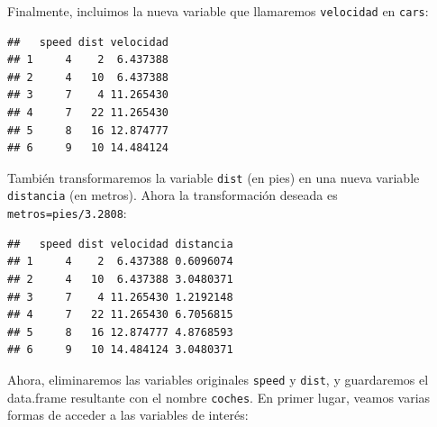 \documentclass[]{book}
\newenvironment{Shaded}{\begin{snugshade}}{\end{snugshade}}
\newcommand{\FloatTok}[1]{\textcolor[rgb]{0.00,0.00,0.81}{#1}}
\newcommand{\KeywordTok}[1]{\textcolor[rgb]{0.13,0.29,0.53}{\textbf{#1}}}
\newcommand{\NormalTok}[1]{#1}
\newcommand{\OperatorTok}[1]{\textcolor[rgb]{0.81,0.36,0.00}{\textbf{#1}}}
\newcommand{\StringTok}[1]{\textcolor[rgb]{0.31,0.60,0.02}{#1}}
\begin{document}
\begin{Shaded}
\end{Shaded}

Finalmente, incluimos la nueva variable que llamaremos
\texttt{velocidad} en \texttt{cars}:

\begin{Shaded}
\end{Shaded}

\begin{verbatim}
##   speed dist velocidad
## 1     4    2  6.437388
## 2     4   10  6.437388
## 3     7    4 11.265430
## 4     7   22 11.265430
## 5     8   16 12.874777
## 6     9   10 14.484124
\end{verbatim}

También transformaremos la variable \texttt{dist} (en pies) en una nueva
variable \texttt{distancia} (en metros). Ahora la transformación deseada es
\texttt{metros=pies/3.2808}:

\begin{Shaded}
\end{Shaded}

\begin{verbatim}
##   speed dist velocidad distancia
## 1     4    2  6.437388 0.6096074
## 2     4   10  6.437388 3.0480371
## 3     7    4 11.265430 1.2192148
## 4     7   22 11.265430 6.7056815
## 5     8   16 12.874777 4.8768593
## 6     9   10 14.484124 3.0480371
\end{verbatim}

Ahora, eliminaremos las variables originales \texttt{speed} y
\texttt{dist}, y guardaremos el data.frame resultante con el nombre \texttt{coches}.
En primer lugar, veamos varias formas de acceder a las variables de
interés:
\end{document}
